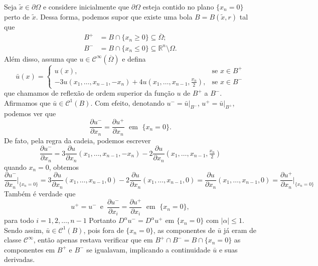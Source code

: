 \documentclass[a4paper, 11pt]{book}
\theoremstyle{definition}
\newcommand{\bR}{\mathbb{R}}
\newcommand{\cC}{\mathcal{C}}
\begin{document}
\begin{prf}
    Seja $\tilde x \in \partial\Omega$ e considere inicialmente que $\partial\Omega$ esteja contido no plano $\{x_n = 0\}$ perto de $\tilde x$.
    Dessa forma, podemos supor que existe uma bola $B = B(\tilde x, r)$ tal que
    \begin{equation} \label{eq:reflexao}
        \begin{aligned}
            B^+ &= B \cap \{x_n \geqslant 0\} \subseteq \overline\Omega;\\
            B^- &= B \cap \{x_n \leqslant 0\} \subseteq \bR^n \setminus \Omega.
        \end{aligned}
    \end{equation}
    Além disso, assuma que $u \in \cC^\infty(\overline\Omega)$ e defina
    \[
        \bar u(x) =
        \left\{ 
            \begin{array}{ll}
                u(x), & \text{se } x\in B^+\\
                -3u(x_1,\dots,x_{n-1}, -x_n) + 4u(x_1,\dots,x_{n-1},\frac{x_n}{2}), & \text{se } x \in B^-
            \end{array}
        \right.
    \]
    que chamamos de reflexão de ordem superior da função $u$ de $B^+$ a $B^-$.
    Afirmamos que $\bar u \in \cC^1(B)$.
    Com efeito, denotando $u^- = \bar u \big|_{B^-}$, $u^+ = \bar u \big|_{B^+}$, podemos ver que
    \[
        \dfrac{\partial u^-}{\partial x_n} = \dfrac{\partial u^+}{\partial x_n} \;\text{ em }\; \{x_n = 0\}.
    \]
    De fato, pela regra da cadeia, podemos escrever
    \[
        \dfrac{\partial u^-}{\partial x_n} = 3 \frac{\partial u}{\partial x_n}(x_1,\dots,x_{n-1}, -x_n)  - 2\frac{\partial u}{\partial x_n}(x_1,\dots,x_{n-1},\tfrac{x_n}{2})
    \]
    quando $x_n = 0$, obtemos
    \[
        \dfrac{\partial u^-}{\partial x_n} \Bigg|_{\{x_n = 0\}} \!\!\! = 3\frac{\partial u}{\partial x_n}(x_1,\dots,x_{n-1},0) - 2\frac{\partial u}{\partial x_n}(x_1,\dots,x_{n-1},0) = \frac{\partial u}{\partial x_n}(x_1,\dots,x_{n-1},0) = \dfrac{\partial u^+}{\partial x_n} \Bigg|_{\{x_n =0\}}
    \]
    Também é verdade que
    \[
        u^+ = u^- \,\text{ e }\, \dfrac{\partial u^-}{\partial x_i} = \dfrac{\partial u^+}{\partial x_i}  \;\text{ em }\; \{x_n = 0\},
    \]
    para todo $i = 1,2,\dots,n-1$ Portanto $D^\alpha u^- = D^\alpha u^+$ em $\{x_n = 0\}$ com $|\alpha| \leqslant 1$. Sendo assim, $\bar u \in \cC^1 (B)$, pois fora de $\{x_n = 0\}$, as componentes de $\bar u$ já eram de classe $\cC^\infty$, então apenas restava verificar que em $B^+ \cap B^- = B \cap \{x_n = 0\}$ as componentes em $B^+$ e $B^-$ se igualavam, implicando a continuidade $\bar u$ e suas derivadas.


\end{prf}
\end{document}
